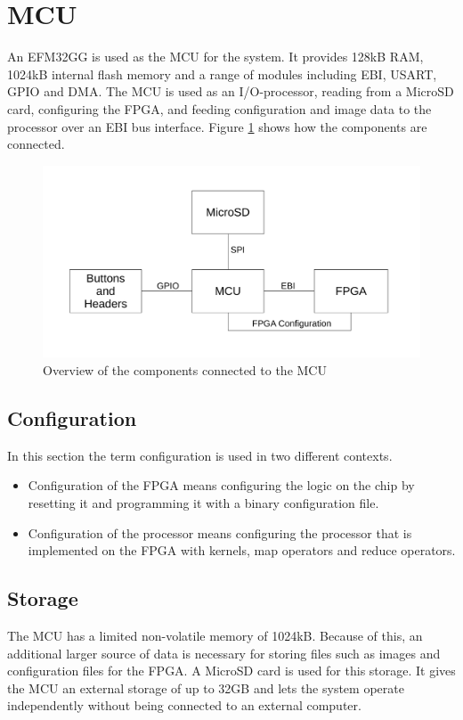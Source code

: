 \section{MCU}

An EFM32GG is used as the MCU for the system.
It provides 128kB RAM, 1024kB internal flash memory and a range of modules including EBI, USART, GPIO and DMA.
The MCU is used as an I/O-processor, reading from a MicroSD card, configuring the FPGA, and feeding configuration and image data to the processor over an EBI bus interface.
Figure \ref{fig:mcuOverview} shows how the components are connected.

\begin{figure}[h!]
    \includegraphics[width=\linewidth]{img/mcu_overview.pdf}
    \caption{Overview of the components connected to the MCU}
    \label{fig:mcuOverview}
\end{figure}

\subsection{Configuration}
In this section the term configuration is used in two different contexts.
\begin{itemize}
	\item Configuration of the FPGA means configuring the logic on the chip by resetting it and programming it with a binary configuration file.
	\item Configuration of the processor means configuring the processor that is implemented on the FPGA with kernels, map operators and reduce operators.
\end{itemize}

\subsection{Storage}
The MCU has a limited non-volatile memory of 1024kB. Because of this, an additional larger source of data is necessary for storing files such as images and configuration files for the FPGA. A MicroSD card is used for this storage. It gives the MCU an external storage of up to 32GB and lets the system operate independently without being connected to an external computer.

